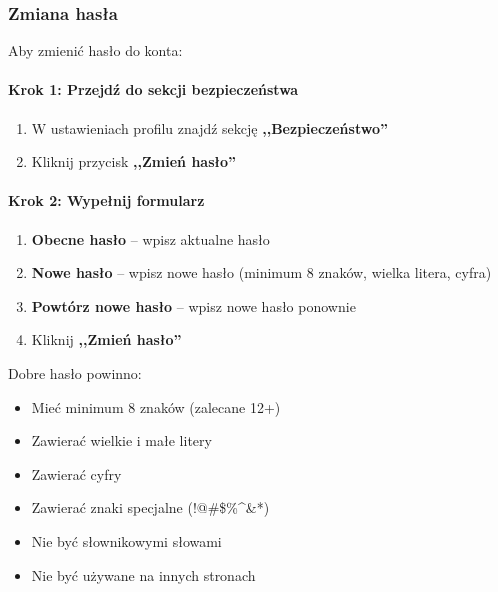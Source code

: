 \documentclass[12pt,a4paper]{article}
\begin{document}
\subsubsection{Zmiana hasła}

Aby zmienić hasło do konta:

\paragraph{Krok 1: Przejdź do sekcji bezpieczeństwa}

\begin{enumerate}
    \item W ustawieniach profilu znajdź sekcję \textbf{,,Bezpieczeństwo''}
    \item Kliknij przycisk \textbf{,,Zmień hasło''}
\end{enumerate}

\paragraph{Krok 2: Wypełnij formularz}

\begin{enumerate}
    \item \textbf{Obecne hasło} -- wpisz aktualne hasło
    \item \textbf{Nowe hasło} -- wpisz nowe hasło (minimum 8 znaków, wielka litera, cyfra)
    \item \textbf{Powtórz nowe hasło} -- wpisz nowe hasło ponownie
    \item Kliknij \textbf{,,Zmień hasło''}
\end{enumerate}


\begin{tcolorbox}[colback=green!5!white,colframe=green!75!black,title=\faLightbulb\ Pro Tip - Silne hasło]
Dobre hasło powinno:
\begin{itemize}
    \item Mieć minimum 8 znaków (zalecane 12+)
    \item Zawierać wielkie i małe litery
    \item Zawierać cyfry
    \item Zawierać znaki specjalne (!@\#\$\%\textasciicircum\&*)
    \item Nie być słownikowymi słowami
    \item Nie być używane na innych stronach
\end{itemize}
\end{tcolorbox}
\end{document}

